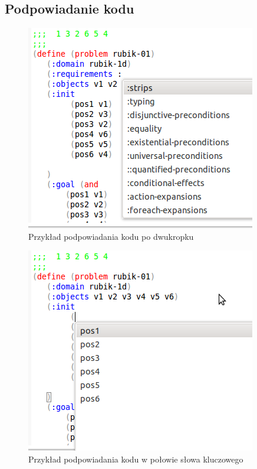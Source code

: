 \subsection{Podpowiadanie kodu}
\begin{figure}[h]
  \centering
    \includegraphics{img/code-assistant1.png}
    \caption{Przykład podpowiadania kodu po dwukropku}
    \label{ana_structure}
\end{figure}
\begin{figure}[h]
  \centering
    \includegraphics{img/code-assistant2.png}
    \caption{Przykład podpowiadania kodu w połowie słowa kluczowego}
    \label{ana_structure}
\end{figure}
